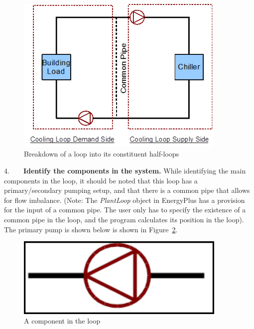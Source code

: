 \begin{figure}[hbtp] %
\centering
\includegraphics[width=0.9\textwidth, height=0.9\textheight, keepaspectratio=true]{media/image004.png}
\caption{Breakdown of a loop into its constituent half-loops \protect \label{fig:breakdown-of-a-loop-into-its-constituent-half}}
\end{figure}

4.~~~~\textbf{Identify the components in the system.} While identifying the main components in the loop, it should be noted that this loop has a primary/secondary pumping setup, and that there is a common pipe that allows for flow imbalance. (Note: The \emph{PlantLoop} object in EnergyPlus has a provision for the input of a common pipe. The user only has to specify the existence of a common pipe in the loop, and the program calculates its position in the loop). The primary pump is shown below is shown in Figure~\ref{fig:a-component-in-the-loop}.

\begin{figure}[hbtp] %
\centering
\includegraphics[width=0.9\textwidth, height=0.9\textheight, keepaspectratio=true]{media/image005.png}
\caption{A component in the loop \protect \label{fig:a-component-in-the-loop}}
\end{figure}

